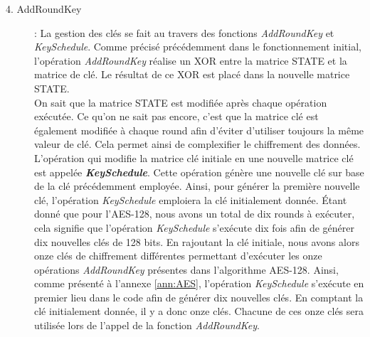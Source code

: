 \documentclass[oneside]{book}
\begin{document}
\begin{description}
\item[4. AddRoundKey] : La gestion des clés se fait au travers des fonctions \textit{AddRoundKey} et \textit{KeySchedule}. Comme précisé précédemment dans le fonctionnement initial, l'opération \textit{AddRoundKey} réalise un XOR entre la matrice STATE et la matrice de clé. Le résultat de ce XOR est placé dans la nouvelle matrice STATE.\\ 
On sait que la matrice STATE est modifiée après chaque opération exécutée. Ce qu'on ne sait pas encore, c'est que la matrice clé est également modifiée à chaque round afin d'éviter d'utiliser toujours la même valeur de clé. Cela permet ainsi de complexifier le chiffrement des données. L'opération qui modifie la matrice clé initiale en une nouvelle matrice clé est appelée \textbf{\textit{KeySchedule}}. Cette opération génère une nouvelle clé sur base de la clé précédemment employée. Ainsi, pour générer la première nouvelle clé, l'opération \textit{KeySchedule} emploiera la clé initialement donnée. Étant donné que pour l'AES-128, nous avons un total de dix rounds à exécuter, cela signifie que l'opération \textit{KeySchedule} s'exécute dix fois afin de générer dix nouvelles clés de 128 bits. En rajoutant la clé initiale, nous avons alors onze clés de chiffrement différentes permettant d'exécuter les onze opérations \textit{AddRoundKey} présentes dans l'algorithme AES-128. Ainsi, comme présenté à l'annexe \ref{ann:AES}, l'opération \textit{KeySchedule} s'exécute en premier lieu dans le code afin de générer dix nouvelles clés. En comptant la clé initialement donnée, il y a donc onze clés. Chacune de ces onze clés sera utilisée lors de l'appel de la fonction \textit{AddRoundKey}.\\ 


\end{description}
\end{document}
